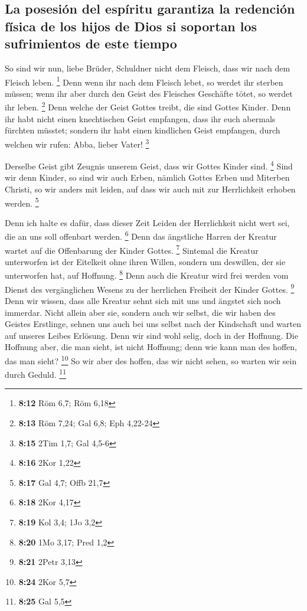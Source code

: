 \hypertarget{la-posesiuxf3n-del-espuxedritu-garantiza-la-redenciuxf3n-fuxedsica-de-los-hijos-de-dios-si-soportan-los-sufrimientos-de-este-tiempo}{%
\subsection{La posesión del espíritu garantiza la redención física de
los hijos de Dios si soportan los sufrimientos de este
tiempo}\label{la-posesiuxf3n-del-espuxedritu-garantiza-la-redenciuxf3n-fuxedsica-de-los-hijos-de-dios-si-soportan-los-sufrimientos-de-este-tiempo}}

 So sind wir nun, liebe Brüder, Schuldner nicht dem
Fleisch, dass wir nach dem Fleisch leben. \footnote{\textbf{8:12} Röm
  6,7; Röm 6,18}  Denn wenn ihr nach dem Fleisch lebet,
so werdet ihr sterben müssen; wenn ihr aber durch den Geist des
Fleisches Geschäfte tötet, so werdet ihr leben. \footnote{\textbf{8:13}
  Röm 7,24; Gal 6,8; Eph 4,22-24}  Denn welche der Geist
Gottes treibt, die sind Gottes Kinder.  Denn ihr habt
nicht einen knechtischen Geist empfangen, dass ihr euch abermals
fürchten müsstet; sondern ihr habt einen kindlichen Geist empfangen,
durch welchen wir rufen: Abba, lieber Vater! \footnote{\textbf{8:15}
  2Tim 1,7; Gal 4,5-6}

 Derselbe Geist gibt Zeugnis unserem Geist, dass wir
Gottes Kinder sind. \footnote{\textbf{8:16} 2Kor 1,22} 
Sind wir denn Kinder, so sind wir auch Erben, nämlich Gottes Erben und
Miterben Christi, so wir anders mit leiden, auf dass wir auch mit zur
Herrlichkeit erhoben werden. \footnote{\textbf{8:17} Gal 4,7; Offb 21,7}

 Denn ich halte es dafür, dass dieser Zeit Leiden der
Herrlichkeit nicht wert sei, die an uns soll offenbart werden.
\footnote{\textbf{8:18} 2Kor 4,17}  Denn das ängstliche
Harren der Kreatur wartet auf die Offenbarung der Kinder Gottes.
\footnote{\textbf{8:19} Kol 3,4; 1Jo 3,2}  Sintemal die
Kreatur unterworfen ist der Eitelkeit ohne ihren Willen, sondern um
deswillen, der sie unterworfen hat, auf Hoffnung. \footnote{\textbf{8:20}
  1Mo 3,17; Pred 1,2}  Denn auch die Kreatur wird frei
werden vom Dienst des vergänglichen Wesens zu der herrlichen Freiheit
der Kinder Gottes. \footnote{\textbf{8:21} 2Petr 3,13} 
Denn wir wissen, dass alle Kreatur sehnt sich mit uns und ängstet sich
noch immerdar.  Nicht allein aber sie, sondern auch wir
selbst, die wir haben des Geistes Erstlinge, sehnen uns auch bei uns
selbst nach der Kindschaft und warten auf unseres Leibes Erlösung.
 Denn wir sind wohl selig, doch in der Hoffnung. Die
Hoffnung aber, die man sieht, ist nicht Hoffnung; denn wie kann man des
hoffen, das man sieht? \footnote{\textbf{8:24} 2Kor 5,7} 
So wir aber des hoffen, das wir nicht sehen, so warten wir sein durch
Geduld. \footnote{\textbf{8:25} Gal 5,5}

